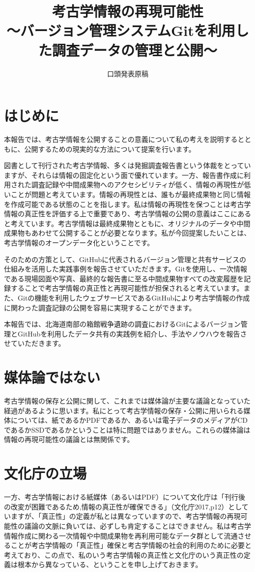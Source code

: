 \documentclass[14Q]{jsarticle}
\title{考古学情報の再現可能性\\
{\large 〜バージョン管理システムGitを利用した調査データの管理と公開〜}
}
\author{口頭発表原稿}
\begin{document}
\maketitle
\section{はじめに}
本報告では、考古学情報を公開することの意義について私の考えを説明するとともに、公開するための現実的な方法について提案を行います。

図書として刊行された考古学情報、多くは発掘調査報告書という体裁をとっていますが、それらは情報の固定化という面で優れています。一方、報告書作成に利用された調査記録や中間成果物へのアクセシビリティが低く、情報の再現性が低いことが問題と考えています。情報の再現性とは、誰もが最終成果物と同じ情報を作成可能である状態のことを指します。私は情報の再現性を保つことは考古学情報の真正性を評価する上で重要であり、考古学情報の公開の意義はここにあると考えています。考古学情報は最終成果物とともに、オリジナルのデータや中間成果物もあわせて公開することが必要となります。私が今回提案したいことは、考古学情報のオープンデータ化ということです。

そのための方策として、GitHubに代表されるバージョン管理と共有サービスの仕組みを活用した実践事例を報告させていただきます。Gitを使用し、一次情報である現場図面や写真、最終的な報告書に至る中間成果物すべての改変履歴を記録することで考古学情報の真正性と再現可能性が担保されると考えています。また、Gitの機能を利用したウェブサービスであるGitHubにより考古学情報の作成に関わった調査記録の公開を容易に実現することができます。

本報告では、北海道南部の箱館戦争遺跡の調査におけるGitによるバージョン管理とGitHubを利用したデータ共有の実践例を紹介し、手法やノウハウを報告させていただきます。

\section{媒体論ではない}
考古学情報の保存と公開に関して、これまでは媒体論が主要な議論となっていた経過があるように思います。私にとって考古学情報の保存・公開に用いられる媒体については、紙であるかPDFであるか、あるいは電子データのメディアがCDであるかSSDであるかということは特に問題ではありません。これらの媒体論は情報の再現可能性の議論とは無関係です。

\section{文化庁の立場}
一方、考古学情報における紙媒体（あるいはPDF）について文化庁は「刊行後の改変が困難であるため,情報の真正性が確保できる」（文化庁2017,p12）としていますが、「真正性」の定義が私とは異なっていますので、考古学情報の再現可能性の議論の文脈に負いては、必ずしも肯定することはできません。私は考古学情報作成に関わる一次情報や中間成果物を再利用可能なデータ群として流通させることが考古学情報の「真正性」確保と考古学情報の社会的利用のために必要と考えており、この点で、私のいう考古学情報の真正性と文化庁のいう真正性の定義は根本から異なっている、ということを申し上げておきます。
\end{document}
